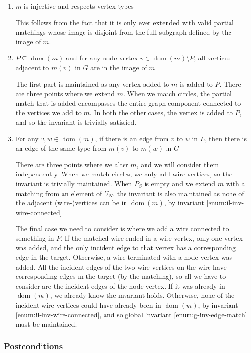\documentclass{article}
\DeclareMathOperator{\dom}{dom}
\begin{document}
\begin{enumerate}
  \renewcommand{\theenumi}{(\arabic{enumi})}
  \renewcommand{\labelenumi}{\theenumi}
  \item $m$ is injective and respects vertex types

  This follows from the fact that it is only ever extended with valid partial matchings whose image is disjoint from the full subgraph defined by the image of $m$.
  \item $P \subseteq \dom(m)$ and for any node-vertex $v \in \dom(m)\setminus P$, all vertices adjacent to $m(v)$ in $G$ are in the image of $m$

  The first part is maintained as any vertex added to $m$ is added to $P$.  There are three points where we extend $m$.  When we match circles, the partial match that is added encompasses the entire graph component connected to the vertices we add to $m$.  In both the other cases, the vertex is added to $P$, and so the invariant is trivially satisfied.

  \item For any $v,w \in \dom(m)$, if there is an edge from $v$ to $w$ in $L$, then there is an edge of the same type from $m(v)$ to $m(w)$ in $G$

  There are three points where we alter $m$, and we will consider them independently.  When we match circles, we only add wire-vertices, so the invariant is trivially maintained.  When $P_S$ is empty and we extend $m$ with a matching from an element of $U_N$, the invariant is also maintained as none of the adjacent (wire-)vertices can be in $\dom(m)$, by invariant \ref{enum:il-inv-wire-connected}.

The final case we need to consider is where we add a wire connected to something in $P$.  If the matched wire ended in a wire-vertex, only one vertex was added, and the only incident edge to that vertex has a corresponding edge in the target.  Otherwise, a wire terminated with a node-vertex was added.  All the incident edges of the two wire-vertices on the wire have corresponding edges in the target (by the matching), so all we have to consider are the incident edges of the node-vertex.  If it was already in $\dom(m)$, we already know the invariant holds.  Otherwise, none of the incident wire-vertices could have already been in $\dom(m)$, by invariant \ref{enum:il-inv-wire-connected}, and so global invariant \ref{enum:g-inv-edge-match} must be maintained.
\end{enumerate}


\subsubsection{Postconditions}
\end{document}
